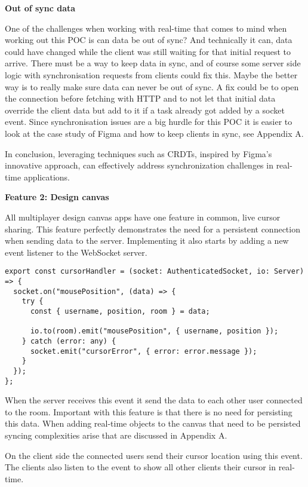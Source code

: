 \textbf{Out of sync data}

One of the challenges when working with real-time that comes to mind when working out this POC is can data be out of sync? And technically it can, data could have changed while the client was still waiting for that initial request to arrive. There must be a way to keep data in sync, and of course some server side logic with synchronisation requests from clients could fix this. Maybe the better way is to really make sure data can never be out of sync. A fix could be to open the connection before fetching with HTTP and to not let that initial data override the client data but add to it if a task already got added by a socket event. Since synchronisation issues are a big hurdle for this POC it is easier to look at the case study of Figma and how to keep clients in sync, see Appendix A.

In conclusion, leveraging techniques such as CRDTs, inspired by Figma's innovative approach, can effectively address synchronization challenges in real-time applications.

\textbf{Feature 2: Design canvas}

All multiplayer design canvas apps have one feature in common, live cursor sharing. This feature perfectly demonstrates the need for a persistent connection when sending data to the server. Implementing it also starts by adding a new event listener to the WebSocket server.

\begin{lstlisting}[caption=Cursor Event Handler]
export const cursorHandler = (socket: AuthenticatedSocket, io: Server) => {
  socket.on("mousePosition", (data) => {
    try {
      const { username, position, room } = data;

      io.to(room).emit("mousePosition", { username, position });
    } catch (error: any) {
      socket.emit("cursorError", { error: error.message });
    }
  });
};
\end{lstlisting}

When the server receives this event it send the data to each other user connected to the room. Important with this feature is that there is no need for persisting this data. When adding real-time objects to the canvas that need to be persisted syncing complexities arise that are discussed in Appendix A.

On the client side the connected users send their cursor location using this event. The clients also listen to the event to show all other clients their cursor in real-time.

